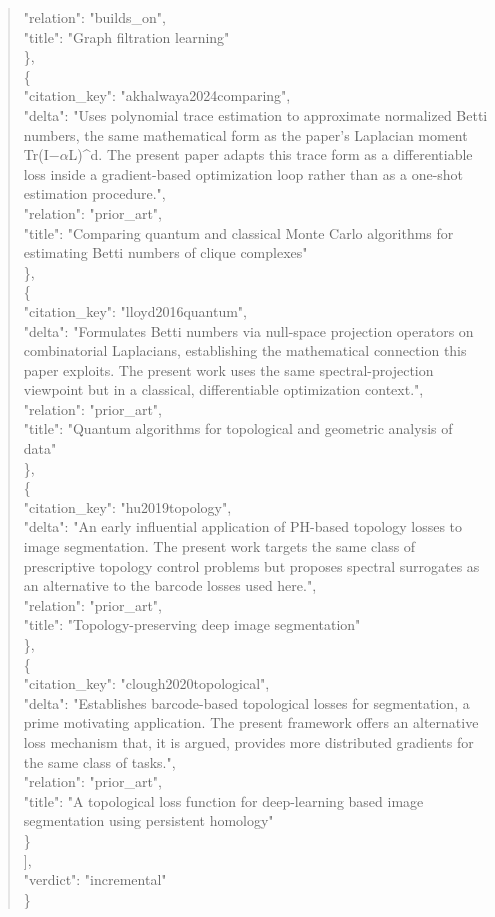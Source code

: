 \documentclass[11pt]{article}
\begin{document}
\begin{quote}
      "relation": "builds\_on",\\
      "title": "Graph filtration learning"\\
    \},\\
    \{\\
      "citation\_key": "akhalwaya2024comparing",\\
      "delta": "Uses polynomial trace estimation to approximate normalized Betti numbers, the same mathematical form as the paper's Laplacian moment Tr(I\ensuremath{-}\ensuremath{\alpha}L)\^{}d. The present paper adapts this trace form as a differentiable loss inside a gradient-based optimization loop rather than as a one-shot estimation procedure.",\\
      "relation": "prior\_art",\\
      "title": "Comparing quantum and classical Monte Carlo algorithms for estimating Betti numbers of clique complexes"\\
    \},\\
    \{\\
      "citation\_key": "lloyd2016quantum",\\
      "delta": "Formulates Betti numbers via null-space projection operators on combinatorial Laplacians, establishing the mathematical connection this paper exploits. The present work uses the same spectral-projection viewpoint but in a classical, differentiable optimization context.",\\
      "relation": "prior\_art",\\
      "title": "Quantum algorithms for topological and geometric analysis of data"\\
    \},\\
    \{\\
      "citation\_key": "hu2019topology",\\
      "delta": "An early influential application of PH-based topology losses to image segmentation. The present work targets the same class of prescriptive topology control problems but proposes spectral surrogates as an alternative to the barcode losses used here.",\\
      "relation": "prior\_art",\\
      "title": "Topology-preserving deep image segmentation"\\
    \},\\
    \{\\
      "citation\_key": "clough2020topological",\\
      "delta": "Establishes barcode-based topological losses for segmentation, a prime motivating application. The present framework offers an alternative loss mechanism that, it is argued, provides more distributed gradients for the same class of tasks.",\\
      "relation": "prior\_art",\\
      "title": "A topological loss function for deep-learning based image segmentation using persistent homology"\\
    \}\\
  ],\\
  "verdict": "incremental"\\
\}\\
\end{quote}
\end{document}
